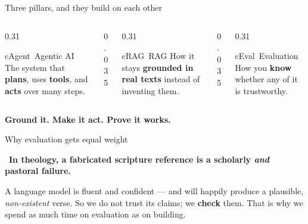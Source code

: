 \begin{frame}{Three pillars, and they build on each other}
  \begin{columns}[t, totalwidth=\textwidth]
    \begin{column}{0.31\textwidth}
      \begin{featbox}{cAgent}{\faRobot\ Agentic AI}
        \small The system that \textbf{plans}, uses \textbf{tools}, and
        \textbf{acts} over many steps.
      \end{featbox}
    \end{column}
    \begin{column}{0.035\textwidth}\end{column}
    \begin{column}{0.31\textwidth}
      \begin{featbox}{cRAG}{\faDatabase\ RAG}
        \small How it stays \textbf{grounded in real texts} instead of
        inventing them.
      \end{featbox}
    \end{column}
    \begin{column}{0.035\textwidth}\end{column}
    \begin{column}{0.31\textwidth}
      \begin{featbox}{cEval}{\faCheckDouble\ Evaluation}
        \small How you \textbf{know} whether any of it is trustworthy.
      \end{featbox}
    \end{column}
  \end{columns}
  \vspace{14pt}
  \begin{center}
    {\large\bfseries
      \textcolor{cRAG}{Ground it.}\quad
      \textcolor{cAgent}{Make it act.}\quad
      \textcolor{cEval}{Prove it works.}}
  \end{center}
\end{frame}

\begin{frame}{Why evaluation gets equal weight}
  \vspace{6pt}
  \begin{calloutbox}[accentgold]
    \large\faExclamationTriangle\ \textbf{In theology, a fabricated scripture
    reference is a scholarly \emph{and} pastoral failure.}
  \end{calloutbox}
  \vspace{14pt}
  \begin{center}
  \begin{minipage}{0.86\textwidth}
    \small
    A language model is fluent and confident --- and will happily produce a
    plausible, \emph{non-existent} verse. So we do not trust its claims;
    we \textbf{check} them. That is why we spend as much time on evaluation
    as on building.
  \end{minipage}
  \end{center}
\end{frame}

